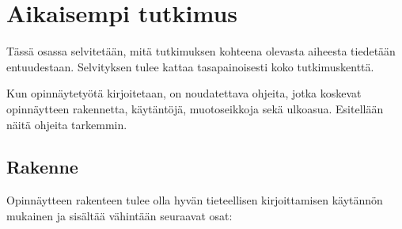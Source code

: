 \section{Aikaisempi tutkimus}

Tässä osassa selvitetään, mitä tutkimuksen kohteena olevasta aiheesta tiedetään
entuudestaan. Selvityksen tulee kattaa tasapainoisesti koko tutkimuskenttä. 

Kun opinnäytetyötä kirjoitetaan, on noudatettava ohjeita, jotka koskevat
opinnäytteen rakennetta, käytäntöjä, muotoseikkoja sekä ulkoasua. Esitellään
näitä ohjeita tarkemmin.


\subsection{Rakenne}

Opinnäytteen rakenteen tulee olla hyvän tieteellisen kirjoittamisen käytännön
mukainen ja sisältää vähintään seuraavat osat:

